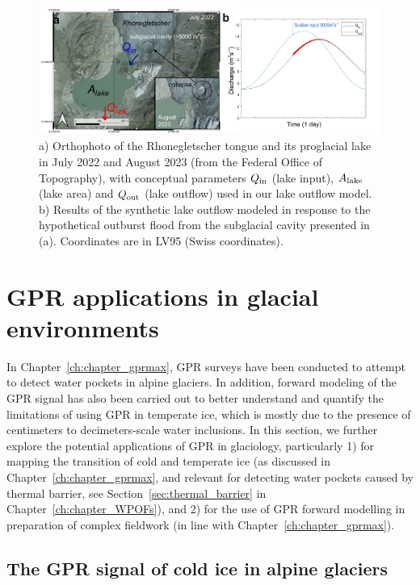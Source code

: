 \begin{figure}[h]
    \centering
    \includegraphics[width=1\textwidth]{chapters/Discussion/WP_rhone.pdf}
    \caption{a) Orthophoto of the Rhonegletscher tongue and its proglacial lake in July 2022 and August 2023 (from the Federal Office of Topography), with conceptual parameters $Q_{\rm in}$ (lake input), $A_{\rm lake}$ (lake area) and $Q_{\rm out}$ (lake outflow) used in our lake outflow model. b) Results of the synthetic lake outflow modeled in response to the hypothetical outburst flood from the subglacial cavity presented in (a). Coordinates are in LV95 (Swiss coordinates).}
    \label{fig:WP_rhone}
\end{figure}



\section{GPR applications in glacial environments}

In Chapter~\ref{ch:chapter_gprmax}, GPR surveys have been conducted to attempt to detect water pockets in alpine glaciers. In addition, forward modeling of the GPR signal has also been carried out to better understand and quantify the limitations of using GPR in temperate ice, which is mostly due to the presence of centimeters to decimeters-scale water inclusions. In this section, we further explore the potential applications of GPR in glaciology, particularly 1) for mapping the transition of cold and temperate ice (as discussed in Chapter~\ref{ch:chapter_gprmax}, and relevant for detecting water pockets caused by thermal barrier, see Section~\ref{sec:thermal_barrier} in Chapter~\ref{ch:chapter_WPOFs}), and 2) for the use of GPR forward modelling in preparation of complex fieldwork (in line with Chapter~\ref{ch:chapter_gprmax}).


\subsection{The GPR signal of cold ice in alpine glaciers}


